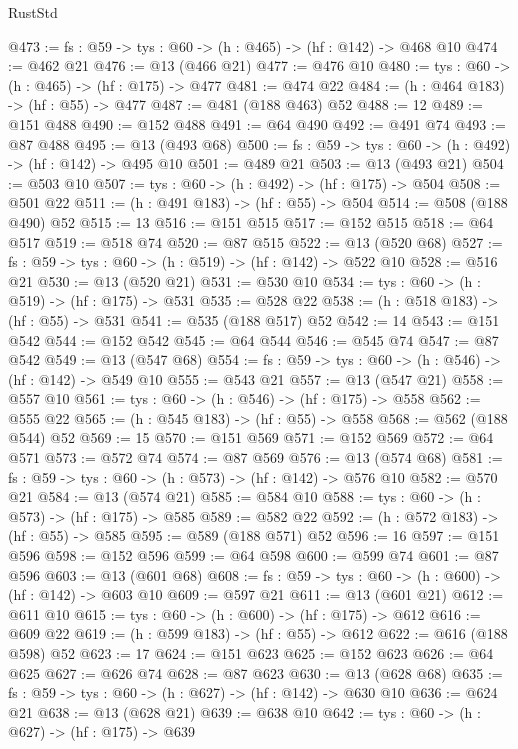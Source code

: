 \begin{lexlean}{RustStd}
\begin{coremodule}
@473 := {fs : @59} -> {tys : @60} -> (h : @465) -> (hf : @142) -> @468 @10
@474 := @462 @21
@476 := @13 (@466 @21)
@477 := @476 @10
@480 := {tys : @60} -> (h : @465) -> (hf : @175) -> @477
@481 := @474 @22
@484 := (h : @464 @183) -> (hf : @55) -> @477
@487 := @481 (@188 @463) @52
@488 := 12
@489 := @151 @488
@490 := @152 @488
@491 := @64 @490
@492 := @491 @74
@493 := @87 @488
@495 := @13 (@493 @68)
@500 := {fs : @59} -> {tys : @60} -> (h : @492) -> (hf : @142) -> @495 @10
@501 := @489 @21
@503 := @13 (@493 @21)
@504 := @503 @10
@507 := {tys : @60} -> (h : @492) -> (hf : @175) -> @504
@508 := @501 @22
@511 := (h : @491 @183) -> (hf : @55) -> @504
@514 := @508 (@188 @490) @52
@515 := 13
@516 := @151 @515
@517 := @152 @515
@518 := @64 @517
@519 := @518 @74
@520 := @87 @515
@522 := @13 (@520 @68)
@527 := {fs : @59} -> {tys : @60} -> (h : @519) -> (hf : @142) -> @522 @10
@528 := @516 @21
@530 := @13 (@520 @21)
@531 := @530 @10
@534 := {tys : @60} -> (h : @519) -> (hf : @175) -> @531
@535 := @528 @22
@538 := (h : @518 @183) -> (hf : @55) -> @531
@541 := @535 (@188 @517) @52
@542 := 14
@543 := @151 @542
@544 := @152 @542
@545 := @64 @544
@546 := @545 @74
@547 := @87 @542
@549 := @13 (@547 @68)
@554 := {fs : @59} -> {tys : @60} -> (h : @546) -> (hf : @142) -> @549 @10
@555 := @543 @21
@557 := @13 (@547 @21)
@558 := @557 @10
@561 := {tys : @60} -> (h : @546) -> (hf : @175) -> @558
@562 := @555 @22
@565 := (h : @545 @183) -> (hf : @55) -> @558
@568 := @562 (@188 @544) @52
@569 := 15
@570 := @151 @569
@571 := @152 @569
@572 := @64 @571
@573 := @572 @74
@574 := @87 @569
@576 := @13 (@574 @68)
@581 := {fs : @59} -> {tys : @60} -> (h : @573) -> (hf : @142) -> @576 @10
@582 := @570 @21
@584 := @13 (@574 @21)
@585 := @584 @10
@588 := {tys : @60} -> (h : @573) -> (hf : @175) -> @585
@589 := @582 @22
@592 := (h : @572 @183) -> (hf : @55) -> @585
@595 := @589 (@188 @571) @52
@596 := 16
@597 := @151 @596
@598 := @152 @596
@599 := @64 @598
@600 := @599 @74
@601 := @87 @596
@603 := @13 (@601 @68)
@608 := {fs : @59} -> {tys : @60} -> (h : @600) -> (hf : @142) -> @603 @10
@609 := @597 @21
@611 := @13 (@601 @21)
@612 := @611 @10
@615 := {tys : @60} -> (h : @600) -> (hf : @175) -> @612
@616 := @609 @22
@619 := (h : @599 @183) -> (hf : @55) -> @612
@622 := @616 (@188 @598) @52
@623 := 17
@624 := @151 @623
@625 := @152 @623
@626 := @64 @625
@627 := @626 @74
@628 := @87 @623
@630 := @13 (@628 @68)
@635 := {fs : @59} -> {tys : @60} -> (h : @627) -> (hf : @142) -> @630 @10
@636 := @624 @21
@638 := @13 (@628 @21)
@639 := @638 @10
@642 := {tys : @60} -> (h : @627) -> (hf : @175) -> @639

\end{coremodule}
\end{lexlean}
